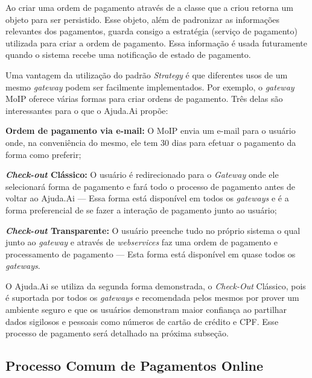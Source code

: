 Ao criar uma ordem de pagamento através de  a classe que a criou retorna um objeto  para ser persistido. Esse objeto, além de padronizar as informações relevantes dos pagamentos, guarda consigo a estratégia (serviço de pagamento) utilizada para criar a ordem de pagamento. Essa informação é usada futuramente quando o sistema recebe uma notificação de estado de pagamento.

Uma vantagem da utilização do padrão \emph{Strategy} é que diferentes usos de um mesmo \emph{gateway} podem ser facilmente implementados. Por exemplo, o \emph{gateway} MoIP oferece várias formas para criar ordens de pagamento. Três delas são interessantes para o que o Ajuda.Ai propõe:

\begin{lista}
  \item \textbf{Ordem de pagamento via e-mail:} O MoIP envia um e-mail para o usuário onde, na conveniência do mesmo, ele tem 30 dias para efetuar o pagamento da forma como preferir;
  \item \textbf{\emph{Check-out} Clássico:} O usuário é redirecionado para o \emph{Gateway} onde ele selecionará forma de pagamento e fará todo o processo de pagamento antes de voltar ao Ajuda.Ai --- Essa forma está disponível em todos os \emph{gateways} e é a forma preferencial de se fazer a interação de pagamento junto ao usuário;
  \item \textbf{\emph{Check-out} Transparente:} O usuário preenche tudo no próprio sistema o qual junto ao \emph{gateway} e através de \emph{webservices} faz uma ordem de pagamento e processamento de pagamento --- Esta forma está disponível em quase todos os \emph{gateways}.
\end{lista}

O Ajuda.Ai se utiliza da segunda forma demonstrada, o \emph{Check-Out} Clássico, pois é suportada por todos os \emph{gateways} e recomendada pelos mesmos por prover um ambiente seguro e que os usuários demonstram maior confiança ao partilhar dados sigilosos e pessoais como números de cartão de crédito e CPF. Esse processo de pagamento será detalhado na próxima subseção.





\subsection{Processo Comum de Pagamentos Online} \label{sec:ajudaai:processo_pagamento}

